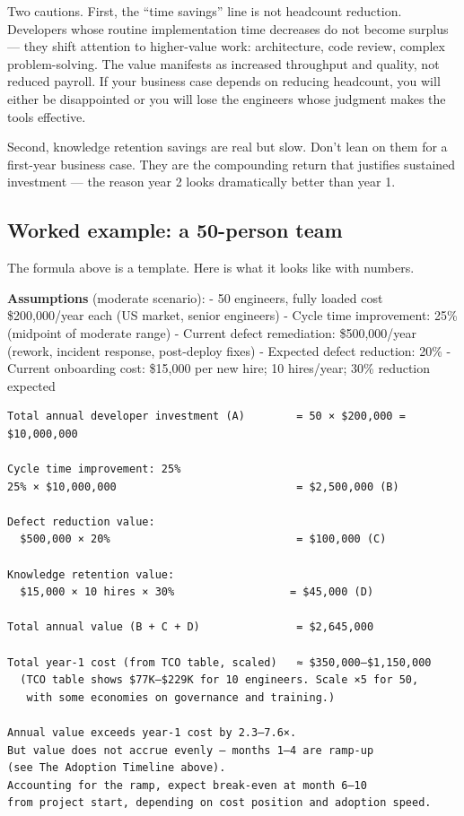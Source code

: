 \documentclass[
  a4paper,
  DIV=11,
  numbers=noendperiod]{scrreprt}
\begin{document}
Two cautions. First, the ``time savings'' line is not headcount
reduction. Developers whose routine implementation time decreases do not
become surplus --- they shift attention to higher-value work:
architecture, code review, complex problem-solving. The value manifests
as increased throughput and quality, not reduced payroll. If your
business case depends on reducing headcount, you will either be
disappointed or you will lose the engineers whose judgment makes the
tools effective.

Second, knowledge retention savings are real but slow. Don't lean on
them for a first-year business case. They are the compounding return
that justifies sustained investment --- the reason year 2 looks
dramatically better than year 1.

\subsection{Worked example: a 50-person
team}\label{worked-example-a-50-person-team}

The formula above is a template. Here is what it looks like with
numbers.

\textbf{Assumptions} (moderate scenario): - 50 engineers, fully loaded
cost \$200,000/year each (US market, senior engineers) - Cycle time
improvement: 25\% (midpoint of moderate range) - Current defect
remediation: \$500,000/year (rework, incident response, post-deploy
fixes) - Expected defect reduction: 20\% - Current onboarding cost:
\$15,000 per new hire; 10 hires/year; 30\% reduction expected

\begin{verbatim}
Total annual developer investment (A)        = 50 × $200,000 = $10,000,000

Cycle time improvement: 25%
25% × $10,000,000                            = $2,500,000 (B)

Defect reduction value:
  $500,000 × 20%                             = $100,000 (C)

Knowledge retention value:
  $15,000 × 10 hires × 30%                  = $45,000 (D)

Total annual value (B + C + D)               = $2,645,000

Total year-1 cost (from TCO table, scaled)   ≈ $350,000–$1,150,000
  (TCO table shows $77K–$229K for 10 engineers. Scale ×5 for 50,
   with some economies on governance and training.)

Annual value exceeds year-1 cost by 2.3–7.6×.
But value does not accrue evenly — months 1–4 are ramp-up
(see The Adoption Timeline above).
Accounting for the ramp, expect break-even at month 6–10
from project start, depending on cost position and adoption speed.
\end{verbatim}
\end{document}
